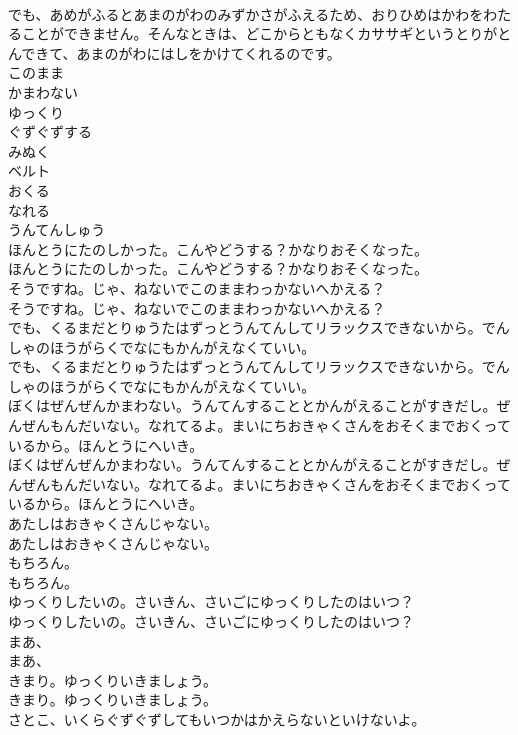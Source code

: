 \documentclass[8pt]{extreport}
\begin{document}
\begin{CJK}{UTF8}{min}
\\	でも、あめがふるとあまのがわのみずかさがふえるため、おりひめはかわをわたることができません。そんなときは、どこからともなくカササギというとりがとんできて、あまのがわにはしをかけてくれるのです。
\\	このまま
\\	かまわない
\\	ゆっくり
\\	ぐずぐずする
\\	みぬく
\\	ベルト
\\	おくる
\\	なれる
\\	うんてんしゅう
\\	ほんとうにたのしかった。こんやどうする？かなりおそくなった。
\\	ほんとうにたのしかった。こんやどうする？かなりおそくなった。
\\	そうですね。じゃ、ねないでこのままわっかないへかえる？
\\	そうですね。じゃ、ねないでこのままわっかないへかえる？
\\	でも、くるまだとりゅうたはずっとうんてんしてリラックスできないから。でんしゃのほうがらくでなにもかんがえなくていい。
\\	でも、くるまだとりゅうたはずっとうんてんしてリラックスできないから。でんしゃのほうがらくでなにもかんがえなくていい。
\\	ぼくはぜんぜんかまわない。うんてんすることとかんがえることがすきだし。ぜんぜんもんだいない。なれてるよ。まいにちおきゃくさんをおそくまでおくっているから。ほんとうにへいき。
\\	ぼくはぜんぜんかまわない。うんてんすることとかんがえることがすきだし。ぜんぜんもんだいない。なれてるよ。まいにちおきゃくさんをおそくまでおくっているから。ほんとうにへいき。
\\	あたしはおきゃくさんじゃない。
\\	あたしはおきゃくさんじゃない。
\\	もちろん。
\\	もちろん。
\\	ゆっくりしたいの。さいきん、さいごにゆっくりしたのはいつ？
\\	ゆっくりしたいの。さいきん、さいごにゆっくりしたのはいつ？
\\	まあ、
\\	まあ、
\\	きまり。ゆっくりいきましょう。
\\	きまり。ゆっくりいきましょう。
\\	さとこ、いくらぐずぐずしてもいつかはかえらないといけないよ。

\end{CJK}
\end{document}

